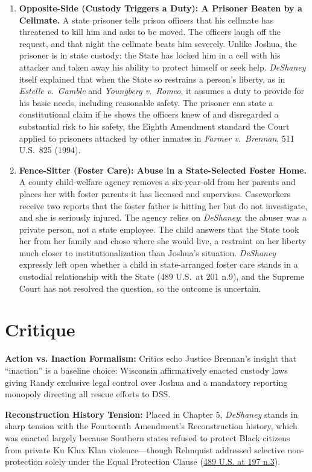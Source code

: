 \documentclass[12pt]{article}
\begin{document}
\begin{enumerate}
\item \textbf{Opposite-Side (Custody Triggers a Duty): A Prisoner Beaten by a Cellmate.} A state prisoner tells prison officers that his cellmate has threatened to kill him and asks to be moved. The officers laugh off the request, and that night the cellmate beats him severely. Unlike Joshua, the prisoner is in state custody: the State has locked him in a cell with his attacker and taken away his ability to protect himself or seek help. \textit{DeShaney} itself explained that when the State so restrains a person's liberty, as in \textit{Estelle v.\ Gamble} and \textit{Youngberg v.\ Romeo}, it assumes a duty to provide for his basic needs, including reasonable safety. The prisoner can state a constitutional claim if he shows the officers knew of and disregarded a substantial risk to his safety, the Eighth Amendment standard the Court applied to prisoners attacked by other inmates in \textit{Farmer v.\ Brennan}, 511 U.S.\ 825 (1994).

\item \textbf{Fence-Sitter (Foster Care): Abuse in a State-Selected Foster Home.} A county child-welfare agency removes a six-year-old from her parents and places her with foster parents it has licensed and supervises. Caseworkers receive two reports that the foster father is hitting her but do not investigate, and she is seriously injured. The agency relies on \textit{DeShaney}: the abuser was a private person, not a state employee. The child answers that the State took her from her family and chose where she would live, a restraint on her liberty much closer to institutionalization than Joshua's situation. \textit{DeShaney} expressly left open whether a child in state-arranged foster care stands in a custodial relationship with the State (489 U.S.\ at 201 n.9), and the Supreme Court has not resolved the question, so the outcome is uncertain.

\end{enumerate}

\section{Critique}
\textbf{Action vs. Inaction Formalism:} Critics echo Justice Brennan's insight that ``inaction'' is a baseline choice: Wisconsin affirmatively enacted custody laws giving Randy exclusive legal control over Joshua and a mandatory reporting monopoly directing all rescue efforts to DSS.

\textbf{Reconstruction History Tension:} Placed in Chapter 5, \textit{DeShaney} stands in sharp tension with the Fourteenth Amendment's Reconstruction history, which was enacted largely because Southern states refused to protect Black citizens from private Ku Klux Klan violence---though Rehnquist addressed selective non-protection solely under the Equal Protection Clause (\href{https://supreme.justia.com/cases/federal/us/489/189/}{489 U.S. at 197 n.3}).
\end{document}
